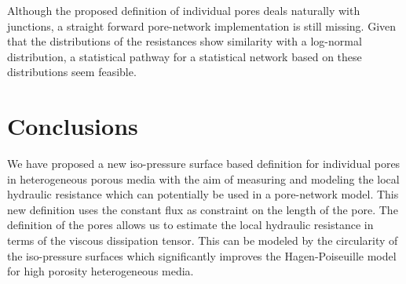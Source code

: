 \documentclass[draft]{agujournal2019}
\begin{document}
Although the proposed definition of individual pores deals naturally with junctions, a straight forward pore-network implementation is still missing. Given that the distributions of the resistances show similarity with a log-normal distribution, a statistical pathway for a statistical network based on these distributions seem feasible.  



\section{Conclusions}
We have proposed a new iso-pressure surface based definition for individual pores in heterogeneous porous media with the aim of measuring and modeling the local hydraulic resistance which can potentially be used in a pore-network model. This new definition uses the constant flux as constraint on the length of the pore. The definition of the pores allows us to estimate the local hydraulic resistance in terms of the viscous dissipation tensor. This can be modeled by the circularity of the iso-pressure surfaces which significantly improves the Hagen-Poiseuille model for high porosity heterogeneous media. 









\end{document}
